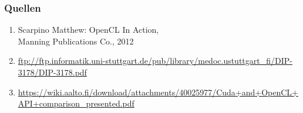 \documentclass{beamer}
\begin{document}
\begin{appendix}
\begin{frame}
\frametitle{Quellen}
\begin{enumerate}
\item Scarpino Matthew: OpenCL In Action, \\Manning Publications Co., 2012
\item \url{ftp://ftp.informatik.uni-stuttgart.de/pub/library/medoc.ustuttgart_fi/DIP-3178/DIP-3178.pdf}
\item \url{https://wiki.aalto.fi/download/attachments/40025977/Cuda+and+OpenCL+API+comparison_presented.pdf}
\end{enumerate}
\end{frame}
\end{appendix}
\end{document}
